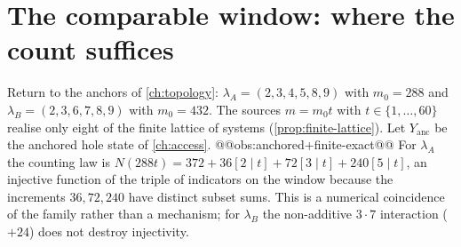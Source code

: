 \section{The comparable window: where the count suffices}\label{sec:window}
Return to the anchors of \cref{ch:topology}: $\lambda_A=(2,3,4,5,8,9)$ with $m_0=288$ and $\lambda_B=(2,3,6,7,8,9)$ with $m_0=432$. The sources $m=m_0t$ with $t\in\{1,\dots,60\}$ realise only eight of the finite lattice of systems (\cref{prop:finite-lattice}). Let $Y_{\mathrm{anc}}$ be the anchored hole state of \cref{ch:access}.
@@obs:anchored+finite-exact@@
For $\lambda_A$ the counting law is $N(288t)=372+36[2\mid t]+72[3\mid t]+240[5\mid t]$, an injective function of the triple of indicators on the window because the increments $36,72,240$ have distinct subset sums. This is a numerical coincidence of the family rather than a mechanism; for $\lambda_B$ the non-additive $3\cdot7$ interaction ($+24$) does not destroy injectivity.


